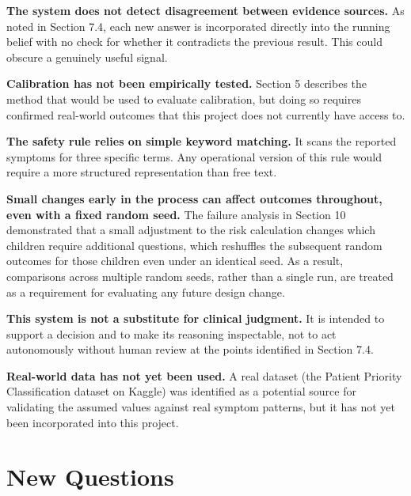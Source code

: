 \documentclass{article}
\begin{document}
\textbf{The system does not detect disagreement between evidence
sources.} As noted in Section 7.4, each new answer is incorporated
directly into the running belief with no check for whether it
contradicts the previous result. This could obscure a genuinely useful
signal.

\textbf{Calibration has not been empirically tested.} Section 5
describes the method that would be used to evaluate calibration, but
doing so requires confirmed real-world outcomes that this project does
not currently have access to.

\textbf{The safety rule relies on simple keyword matching.} It scans the
reported symptoms for three specific terms. Any operational version of
this rule would require a more structured representation than free text.

\textbf{Small changes early in the process can affect outcomes
throughout, even with a fixed random seed.} The failure analysis in
Section 10 demonstrated that a small adjustment to the risk calculation
changes which children require additional questions, which reshuffles
the subsequent random outcomes for those children even under an
identical seed. As a result, comparisons across multiple random seeds,
rather than a single run, are treated as a requirement for evaluating
any future design change.

\textbf{This system is not a substitute for clinical judgment.} It is
intended to support a decision and to make its reasoning inspectable,
not to act autonomously without human review at the points identified in
Section 7.4.

\textbf{Real-world data has not yet been used.} A real dataset (the
Patient Priority Classification dataset on Kaggle) was identified as a
potential source for validating the assumed values against real symptom
patterns, but it has not yet been incorporated into this project.

\hypertarget{new-questions}{%
\section{New Questions}\label{new-questions}}
\end{document}

